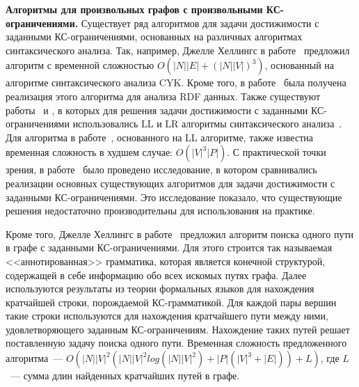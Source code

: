 \textbf{Алгоритмы для произвольных графов с произвольными КС-ограничениями.}  Существует ряд алгоритмов для задачи достижимости с заданными КС-ограничениями, основанных на различных алгоритмах синтаксического анализа. Так, например, Джелле Хеллингс в работе~\cite{hellings2014conjunctive} предложил алгоритм с временной сложностью $O(|N||E| + (|N||V|)^3)$, основанный на алгоритме синтаксического анализа CYK. Кроме того, в работе~\cite{zhang2016context} была получена реализация этого алгоритма для анализа RDF данных. Также существуют работы~\cite{medeiros2018efficient} и \cite{santos2018bottom}, в которых для решения задачи достижимости с заданными КС-ограничениями использовались LL и LR алгоритмы синтаксического анализа~\cite{aho1973theory}. Для алгоритма в работе~\cite{medeiros2018efficient}, основанного на LL алгоритме, также известна временная сложность в худшем случае: $O(|V|^3 |P|)$. С практической точки зрения, в работе~\cite{kuijpers2019experimental} было проведено исследование, в котором сравнивались реализации основных существующих алгоритмов для задачи достижимости с заданными КС-ограничениями. Это исследование показало, что существующие решения недостаточно производительны для использования на практике.

Кроме того, Джелле Хеллингс в работе~\cite{hellings2020explaining} предложил алгоритм поиска одного пути в графе с заданными КС-ограничениями. Для этого строится так называемая <<аннотированная>> грамматика, которая является конечной структурой, содержащей в себе информацию обо всех искомых путях графа. Далее используются результаты из теории формальных языков для нахождения кратчайшей строки, порождаемой КС-грамматикой. Для каждой пары вершин такие строки используются для нахождения кратчайшего пути между ними, удовлетворяющего заданным КС-ограничениям. Нахождение таких путей решает поставленную задачу поиска одного пути. Временная сложность предложенного алгоритма~--- $O(|N||V|^2(|N||V|^2log(|N||V|^2) + |P|(|V|^3 + |E|)) + L)$, где $L$~--- сумма длин найденных кратчайших путей в графе.

